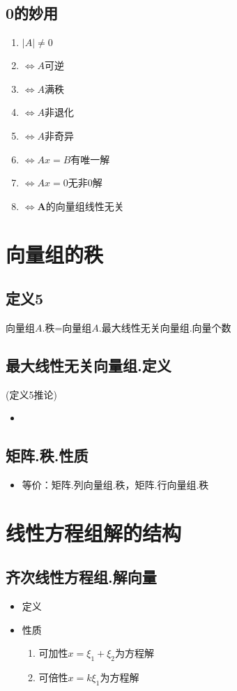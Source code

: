 \documentclass[UTF8,a4paper,12pt,scheme=chinese]{ctexbook}
\begin{document}
	\subsection{0的妙用}
	\begin{enumerate}
		\item $|A|\ne 0$
		\item$\Leftrightarrow A$可逆
		\item$\Leftrightarrow A$满秩
		\item$\Leftrightarrow A$非退化
		\item$\Leftrightarrow A$非奇异
		\item$\Leftrightarrow Ax=B$有唯一解
		\item$\Leftrightarrow Ax=0$无非0解
		\item$\Leftrightarrow \boldsymbol{A}$的向量组线性无关
	\end{enumerate}
	
	\section{向量组的秩}
	\subsection{定义5}
	向量组$A$.秩=向量组$A$.最大线性无关向量组.向量个数
	\subsection{最大线性无关向量组.定义}
	(定义5推论)
	\begin{itemize}
		\item 
	\end{itemize}
	\subsection{矩阵.秩.性质}
	\begin{itemize}
		\item 等价：矩阵.列向量组.秩，矩阵.行向量组.秩
	\end{itemize}
	\section{线性方程组解的结构}
	\subsection{齐次线性方程组.解向量}
	\begin{itemize}
		\item 定义
		\item 性质
		\begin{enumerate}
			\item 可加性\quad$ x=\xi_1+\xi_2 $为方程解
			\item 可倍性\quad$ x=k\xi_1 $为方程解
		\end{enumerate}
	\end{itemize}
\end{document}
